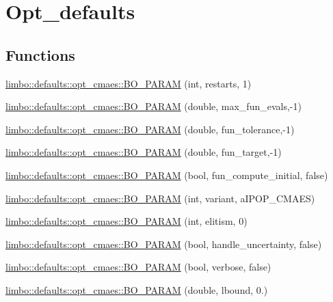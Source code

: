 \hypertarget{group__opt__defaults}{}\section{Opt\+\_\+defaults}
\label{group__opt__defaults}
\subsection*{Functions}
\begin{DoxyCompactItemize}
\item 
\hyperlink{group__opt__defaults_gaba7127b5e591a72095bd6c3a4155828d}{limbo\+::defaults\+::opt\+\_\+cmaes\+::\+B\+O\+\_\+\+P\+A\+R\+A\+M} (int, restarts, 1)
\item 
\hyperlink{group__opt__defaults_ga5130bd236acff913c59380059474ebab}{limbo\+::defaults\+::opt\+\_\+cmaes\+::\+B\+O\+\_\+\+P\+A\+R\+A\+M} (double, max\+\_\+fun\+\_\+evals,-\/1)
\item 
\hyperlink{group__opt__defaults_ga5f980ba02cafe6ee52d6b9cd485e3d05}{limbo\+::defaults\+::opt\+\_\+cmaes\+::\+B\+O\+\_\+\+P\+A\+R\+A\+M} (double, fun\+\_\+tolerance,-\/1)
\item 
\hyperlink{group__opt__defaults_ga1b4276da9161bb04b84b4cd9307a37ab}{limbo\+::defaults\+::opt\+\_\+cmaes\+::\+B\+O\+\_\+\+P\+A\+R\+A\+M} (double, fun\+\_\+target,-\/1)
\item 
\hyperlink{group__opt__defaults_ga14aff955e1360233e5ac361bdd2f3118}{limbo\+::defaults\+::opt\+\_\+cmaes\+::\+B\+O\+\_\+\+P\+A\+R\+A\+M} (bool, fun\+\_\+compute\+\_\+initial, false)
\item 
\hyperlink{group__opt__defaults_gaf6fe5f409527ed056cee8cf8df52da9e}{limbo\+::defaults\+::opt\+\_\+cmaes\+::\+B\+O\+\_\+\+P\+A\+R\+A\+M} (int, variant, a\+I\+P\+O\+P\+\_\+\+C\+M\+A\+E\+S)
\item 
\hyperlink{group__opt__defaults_ga660850db2d1f35863416f9790fe5125e}{limbo\+::defaults\+::opt\+\_\+cmaes\+::\+B\+O\+\_\+\+P\+A\+R\+A\+M} (int, elitism, 0)
\item 
\hyperlink{group__opt__defaults_gad4f97065dd716df6c84e093059ab39f6}{limbo\+::defaults\+::opt\+\_\+cmaes\+::\+B\+O\+\_\+\+P\+A\+R\+A\+M} (bool, handle\+\_\+uncertainty, false)
\item 
\hyperlink{group__opt__defaults_gae78e735b53742e438847fb63817f2ed1}{limbo\+::defaults\+::opt\+\_\+cmaes\+::\+B\+O\+\_\+\+P\+A\+R\+A\+M} (bool, verbose, false)
\item 
\hyperlink{group__opt__defaults_ga0af64a0a2ea5ba01473e0cf284154dea}{limbo\+::defaults\+::opt\+\_\+cmaes\+::\+B\+O\+\_\+\+P\+A\+R\+A\+M} (double, lbound, 0.)

\end{DoxyCompactItemize}

